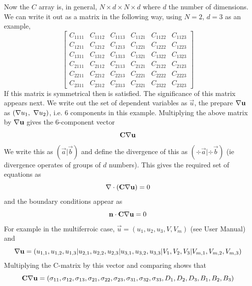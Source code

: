 \documentclass[a4paper]{article}
\begin{document}
Now the $C$ array is, in general, $N\times d\times N\times d$ where
$d$ the number of dimensions. We can write it out as a matrix in the
following way, using $N=2$, $d=3$ as an example,
\begin{equation}
  \left[\begin{array}{ccc|ccc}
    C_{1111} & C_{1112} & C_{1113} & C_{1121} & C_{1122} & C_{1123}\\
    C_{1211} & C_{1212} & C_{1213} & C_{1221} & C_{1222} & C_{1223}\\
    C_{1311} & C_{1312} & C_{1313} & C_{1321} & C_{1322} & C_{1323}\\ \hline
    C_{2111} & C_{2112} & C_{2113} & C_{2121} & C_{2122} & C_{2123}\\
    C_{2211} & C_{2212} & C_{2213} & C_{2221} & C_{2222} & C_{2223}\\
    C_{2311} & C_{2312} & C_{2313} & C_{2321} & C_{2322} & C_{2323}
  \end{array}\right]
  \label{Cmat}
\end{equation}
If this matrix is symmetrical then  is satisfied.  The significance
of this matrix appears next. We write out the set of dependent variables as
$\vec u$, the prepare $\nabla\mathbf{u}$ as $(\nabla u_1,~\nabla u_2)$,
i.e. 6 components in this example. Multiplying the above matrix by
$\nabla\mathbf{u}$ gives the 6-component vector
\begin{equation}
  \mathbf{C}\nabla\mathbf{u}
\end{equation}
We write this as $(\vec a|\vec b)$ and define the divergence of this
as $(\div\vec a|\div\vec b)$ (ie divergence operates of groups of
$d$ numbers). This gives the required set of equations as
\begin{equation}
  \nabla\cdot (\mathbf{C}\nabla\mathbf{u})=0
\end{equation}
and the boundary conditions appear as
\begin{equation}
  \mathbf{n}\cdot\mathbf{C}\nabla\mathbf{u}=0
\end{equation}
For example in the multiferroic case, $\vec u=(u_1,u_2,u_3,V,V_m)$
(see User Manual) and
\begin{equation}
  \nabla\mathbf{u}=(u_{1,1},u_{1,2},u_{1,3}|u_{2,1},u_{2,2},u_{2,3}|u_{3,1},u_{3,2},u_{3,3}|
V_1,V_2,V_3|V_{m,1}, V_{m,2}, V_{m,3})
\end{equation}
Multiplying the C-matrix by this vector and comparing shows that
\begin{equation}
  \mathbf{C}\nabla\mathbf{u}=(\sigma_{11},\sigma_{12},\sigma_{13},\sigma_{21},\sigma_{22},\sigma_{23},
\sigma_{31},\sigma_{32},\sigma_{33},D_1,D_2,D_3,B_1,B_2,B_3)
\end{equation}
\end{document}
